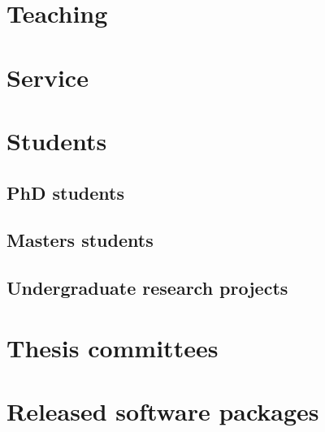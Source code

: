 \documentclass{article}
\begin{document}
\section*{Teaching}




\section*{Service}




\section*{Students}

\subsection*{PhD students}



\subsection*{Masters students}



\subsection*{Undergraduate research projects}




\section*{Thesis committees}




\section*{Released software packages}
\end{document}
